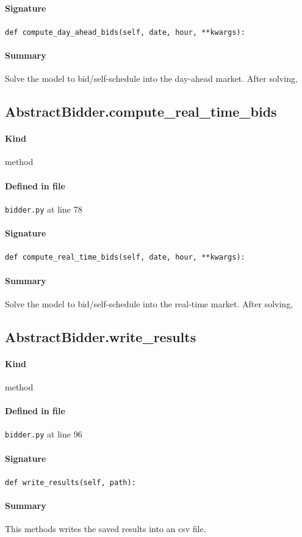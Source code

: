 \documentclass[11pt]{report}
\begin{document}
\paragraph{Signature} \texttt{def compute\_day\_ahead\_bids(self, date, hour, **kwargs):}
\paragraph{Summary} Solve the model to bid/self-schedule into the day-ahead market. After solving,
\subsection{AbstractBidder.compute\_real\_time\_bids}
\label{def:bidder.py:AbstractBidder.compute_real_time_bids:L78}
\paragraph{Kind} method
\paragraph{Defined in file} \texttt{bidder.py} at line 78
\paragraph{Signature} \texttt{def compute\_real\_time\_bids(self, date, hour, **kwargs):}
\paragraph{Summary} Solve the model to bid/self-schedule into the real-time market. After solving,
\subsection{AbstractBidder.write\_results}
\label{def:bidder.py:AbstractBidder.write_results:L96}
\paragraph{Kind} method
\paragraph{Defined in file} \texttt{bidder.py} at line 96
\paragraph{Signature} \texttt{def write\_results(self, path):}
\paragraph{Summary} This methods writes the saved results into an csv file.
\end{document}
